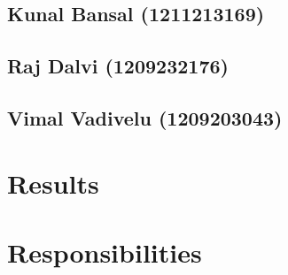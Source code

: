 \documentclass[14pt]{article}
\begin{document}
		\subsection{Kunal Bansal (1211213169)}
		\subsection{Raj Dalvi (1209232176)}
		\subsection{Vimal Vadivelu (1209203043)}
	
	\section{Results}
	
	\section{Responsibilities}
	\begin{table*}[t]
		\centering
		\begin{tabular}{lrrrrrrr}
			\hline
		\end{tabular}
	\end{table*}

\end{document}
